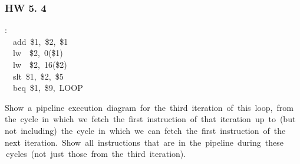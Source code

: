 \documentclass[xcolor=table]{beamer}
\begin{document}
\begin{mdframe}%

\frametitle{HW 5. 4}\label{heading-sec-hw-5-4}%
\begin{mdpre}%
:\\
~~{add}~\$1,~\$2,~\$1\\
~~{lw}~~\$2,~{0}(\$1)\\
~~{lw}~~\$2,~{16}(\$2)\\
~~{slt}~\$1,~\$2,~\$5\\
~~{beq}~\$1,~\$9,~{LOOP}%
\end{mdpre}\noindent{} Show  a  pipeline  execution  diagram  for  the  third  iteration  of  this  loop,  from  the  cycle  in  which  we  fetch  the  first  instruction  of  that  iteration  up  to  (but  not  including)  the  cycle  in  which  we  can  fetch  the  first  instruction  of  the  next  iteration.  Show  all  instructions  that  are  in  the  pipeline  during  these  cycles  (not  just  those  from  the  third  iteration).
\end{mdframe}\label{sec-hw-5-4}%
\end{document}
